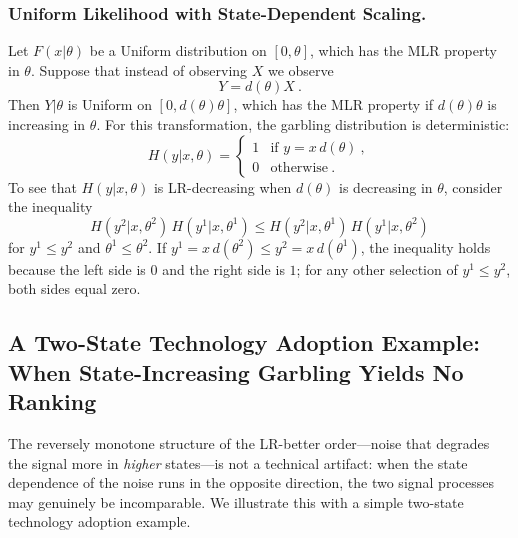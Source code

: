\subsubsection{Uniform Likelihood with State-Dependent Scaling.}
\label{sec:uniform-example}
Let $F(x|\theta)$ be a Uniform distribution on $[0, \theta]$, which
has the MLR property in $\theta$. Suppose that instead of observing
$X$ we observe
\begin{equation}
Y = d(\theta) X \ .
\end{equation}
Then $Y|\theta$ is Uniform on $[0, d(\theta)\theta]$, which has the
MLR property if $d(\theta)\theta$ is increasing in $\theta$. For this
transformation, the garbling distribution is deterministic:
\begin{equation}
H(y|x,\theta) = \left\{
\begin{array}{cl}
1 & \mbox{if } y = x\, d(\theta)\ , \\
0 & \mbox{otherwise}\ .
\end{array}\right.
\end{equation}
To see that $H(y|x,\theta)$ is LR-decreasing when $d(\theta)$ is
decreasing in $\theta$, consider the inequality
\begin{equation}
H(y^2|x,\theta^2)\, H(y^1|x,\theta^1) \leq
H(y^2|x,\theta^1)\, H(y^1|x,\theta^2) \label{eq:uniform-LR}
\end{equation}
for $y^1 \leq y^2$ and $\theta^1 \leq \theta^2$. If
$y^1 = x\, d(\theta^2) \leq y^2 = x\, d(\theta^1)$, the inequality
holds because the left side is $0$ and the right side is $1$; for any
other selection of $y^1 \leq y^2$, both sides equal zero.

\subsection{A Two-State Technology Adoption Example: When
State-Increasing Garbling Yields No Ranking}\label{sec:tech-example}

The reversely monotone structure of the LR-better order---noise that
degrades the signal more in \emph{higher} states---is not a technical
artifact: when the state dependence of the noise runs in the opposite
direction, the two signal processes may genuinely be incomparable. We
illustrate this with a simple two-state technology adoption example.

